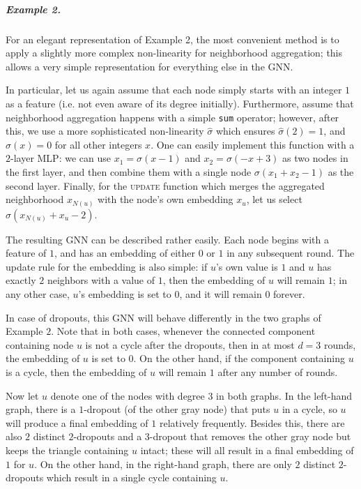 \documentclass{article}
\begin{document}
\subparagraph*{Example 2.} For an elegant representation of Example 2, the most convenient method is to apply a slightly more complex non-linearity for neighborhood aggregation; this allows a very simple representation for everything else in the GNN.

In particular, let us again assume that each node simply starts with an integer $1$ as a feature (i.e. not even aware of its degree initially). Furthermore, assume that neighborhood aggregation happens with a simple \texttt{sum} operator; however, after this, we use a more sophisticated non-linearity $\hat{\sigma}$ which ensures $\hat{\sigma}(2)=1$, and $\hat{\sigma}(x)=0$ for all other integers $x$. One can easily implement this function with a $2$-layer MLP: we can use $x_1=\sigma(x-1)$ and $x_2=\sigma(-x+3)$ as two nodes in the first layer, and then combine them with a single node $\sigma(x_1+x_2-1)$ as the second layer. Finally, for the \textsc{update} function which merges the aggregated neighborhood $x_{N(u)}$ with the node's own embedding $x_u$, let us select $\sigma(x_{N(u)} + x_u - 2)$.

The resulting GNN can be described rather easily. Each node begins with a feature of $1$, and has an embedding of either $0$ or $1$ in any subsequent round. The update rule for the embedding is also simple: if $u$'s own value is $1$ and $u$ has exactly $2$ neighbors with a value of $1$, then the embedding of $u$ will remain $1$; in any other case, $u$'s embedding is set to $0$, and it will remain $0$ forever.

In case of dropouts, this GNN will behave differently in the two graphs of Example $2$. Note that in both cases, whenever the connected component  containing node $u$ is not a cycle after the dropouts, then in at most $d=3$ rounds, the embedding of $u$ is set to $0$. On the other hand, if the component containing $u$ is a cycle, then the embedding of $u$ will remain $1$ after any number of rounds.

Now let $u$ denote one of the nodes with degree $3$ in both graphs. In the left-hand graph, there is a $1$-dropout (of the other gray node) that puts $u$ in a cycle, so $u$ will produce a final embedding of $1$ relatively frequently. Besides this, there are also $2$ distinct $2$-dropouts and a $3$-dropout that removes the other gray node but keeps the triangle containing $u$ intact; these will all result in a final embedding of $1$ for $u$. On the other hand, in the right-hand graph, there are only $2$ distinct $2$-dropouts which result in a single cycle containing $u$.
\end{document}
